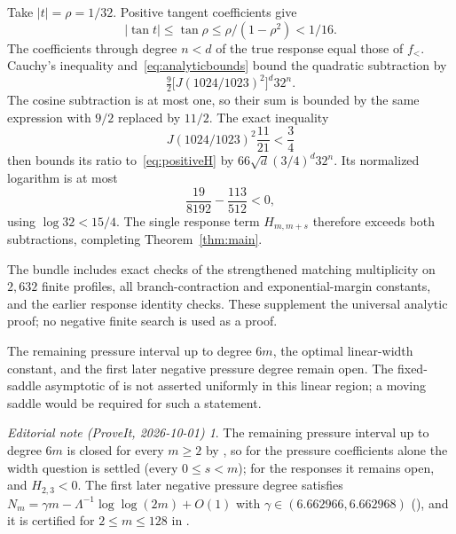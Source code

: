 \documentclass[11pt,a4paper]{article}
\theoremstyle{remark}\newtheorem*{ednote}{Editorial note (ProveIt, 2026-10-01)}
\begin{document}
Take $|t|=\rho=1/32$. Positive tangent coefficients give
\[
|\tan t|\le\tan\rho\le\rho/(1-\rho^2)<1/16.
\]
The coefficients through degree $n<d$ of the true response equal those of $f_{<}$. Cauchy's inequality and~\eqref{eq:analyticbounds} bound the quadratic subtraction by
\[
\tfrac92\bigl[J(1024/1023)^2\bigr]^d32^n.
\]
The cosine subtraction is at most one, so their sum is bounded by the same expression with $9/2$ replaced by $11/2$. The exact inequality
\[
J(1024/1023)^2\frac{11}{21}<\frac34
\]
then bounds its ratio to~\eqref{eq:positiveH} by $66\sqrt d(3/4)^d32^n$. Its normalized logarithm is at most
\[
\frac{19}{8192}-\frac{113}{512}<0,
\]
using $\log32<15/4$. The single response term $H_{m,m+s}$ therefore exceeds both subtractions, completing Theorem~\ref{thm:main}.

The bundle includes exact checks of the strengthened matching multiplicity on $2,632$ finite profiles, all branch-contraction and exponential-margin constants, and the earlier response identity checks. These supplement the universal analytic proof; no negative finite search is used as a proof.

The remaining pressure interval up to degree $6m$, the optimal linear-width constant, and the first later negative pressure degree remain open. The fixed-saddle asymptotic of \cite{offset} is not asserted uniformly in this linear region; a moving saddle would be required for such a statement.
\begin{ednote}
The remaining pressure interval up to degree $6m$ is closed for every $m\ge2$ by
, so for the pressure coefficients alone the width question is
settled (every $0\le s<m$); for the responses it remains open, and $H_{2,3}<0$. The first later
negative pressure degree satisfies $N_m=\gamma m-\Lambda^{-1}\log\log(2m)+O(1)$ with $\gamma\in(6.662966,6.662968)$ (), and it is
certified for $2\le m\le128$ in .
\end{ednote}
\end{document}
